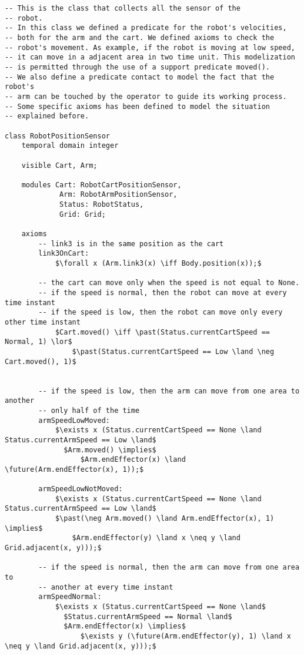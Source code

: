 \begin{lstlisting}[fontadjust, mathescape, frame=single] 
-- This is the class that collects all the sensor of the
-- robot.
-- In this class we defined a predicate for the robot's velocities,
-- both for the arm and the cart. We defined axioms to check the
-- robot's movement. As example, if the robot is moving at low speed,
-- it can move in a adjacent area in two time unit. This modelization
-- is permitted through the use of a support predicate moved().
-- We also define a predicate contact to model the fact that the robot's
-- arm can be touched by the operator to guide its working process.
-- Some specific axioms has been defined to model the situation
-- explained before.

class RobotPositionSensor
    temporal domain integer

    visible Cart, Arm;

    modules Cart: RobotCartPositionSensor,
             Arm: RobotArmPositionSensor,
             Status: RobotStatus,
             Grid: Grid;

    axioms
        -- link3 is in the same position as the cart
        link3OnCart: 
            $\forall x (Arm.link3(x) \iff Body.position(x));$

        -- the cart can move only when the speed is not equal to None.
        -- if the speed is normal, then the robot can move at every time instant
        -- if the speed is low, then the robot can move only every other time instant
            $Cart.moved() \iff \past(Status.currentCartSpeed == Normal, 1) \lor$
                $\past(Status.currentCartSpeed == Low \land \neg Cart.moved(), 1)$
            

        -- if the speed is low, then the arm can move from one area to another
        -- only half of the time
        armSpeedLowMoved: 
            $\exists x (Status.currentCartSpeed == None \land Status.currentArmSpeed == Low \land$
              $Arm.moved() \implies$ 
                  $Arm.endEffector(x) \land \future(Arm.endEffector(x), 1));$

        armSpeedLowNotMoved: 
            $\exists x (Status.currentCartSpeed == None \land Status.currentArmSpeed == Low \land$ 
            $\past(\neg Arm.moved() \land Arm.endEffector(x), 1) \implies$ 
                $Arm.endEffector(y) \land x \neq y \land Grid.adjacent(x, y)));$

        -- if the speed is normal, then the arm can move from one area to 
        -- another at every time instant
        armSpeedNormal: 
            $\exists x (Status.currentCartSpeed == None \land$
              $Status.currentArmSpeed == Normal \land$
              $Arm.endEffector(x) \implies$
                  $\exists y (\future(Arm.endEffector(y), 1) \land x \neq y \land Grid.adjacent(x, y)));$


\end{lstlisting}
